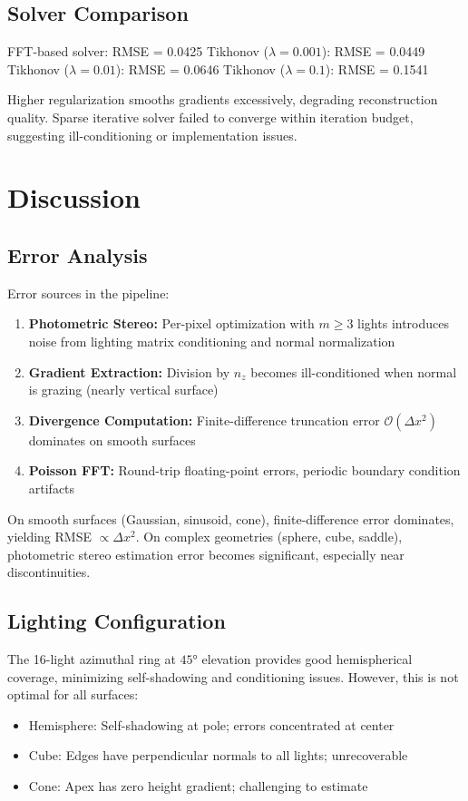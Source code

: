 \documentclass[11pt]{article}
\begin{document}
\subsection{Solver Comparison}

FFT-based solver: RMSE = 0.0425
Tikhonov ($\lambda = 0.001$): RMSE = 0.0449
Tikhonov ($\lambda = 0.01$): RMSE = 0.0646
Tikhonov ($\lambda = 0.1$): RMSE = 0.1541

Higher regularization smooths gradients excessively, degrading reconstruction quality. Sparse iterative solver failed to converge within iteration budget, suggesting ill-conditioning or implementation issues.

\newpage
\section{Discussion}\label{sec:discussion}

\subsection{Error Analysis}

Error sources in the pipeline:

\begin{enumerate}
\item \textbf{Photometric Stereo:} Per-pixel optimization with $m \ge 3$ lights introduces noise from lighting matrix conditioning and normal normalization
\item \textbf{Gradient Extraction:} Division by $n_z$ becomes ill-conditioned when normal is grazing (nearly vertical surface)
\item \textbf{Divergence Computation:} Finite-difference truncation error $\mathcal{O}(\Delta x^2)$ dominates on smooth surfaces
\item \textbf{Poisson FFT:} Round-trip floating-point errors, periodic boundary condition artifacts
\end{enumerate}

On smooth surfaces (Gaussian, sinusoid, cone), finite-difference error dominates, yielding RMSE $\propto \Delta x^2$. On complex geometries (sphere, cube, saddle), photometric stereo estimation error becomes significant, especially near discontinuities.

\subsection{Lighting Configuration}

The 16-light azimuthal ring at $45°$ elevation provides good hemispherical coverage, minimizing self-shadowing and conditioning issues. However, this is not optimal for all surfaces:
\begin{itemize}
\item Hemisphere: Self-shadowing at pole; errors concentrated at center
\item Cube: Edges have perpendicular normals to all lights; unrecoverable
\item Cone: Apex has zero height gradient; challenging to estimate
\end{itemize}
\end{document}
